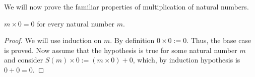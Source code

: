 We will now prove the familiar properties of multiplication of natural
numbers.
\begin{prop}\label{c1s5p1}
$m \times 0 = 0$ for every natural number $m$.
\end{prop}
\begin{proof}
We will use induction on $m$. By definition $0 \times 0 := 0$. Thus, the
base case is proved. Now assume that the hypothesis is true for some 
natural number $m$ and consider $S(m) \times 0 := (m \times 0) + 0$, which,
by induction hypothesis is $0 + 0 = 0$.
\end{proof}

